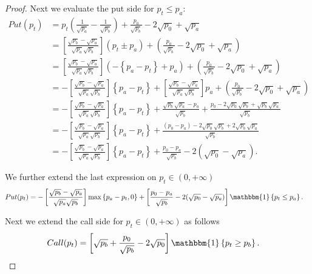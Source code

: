 \documentclass[pdftex,11pt,a4paper] {article}
\begin{document}
\begin{proof}
Next we evaluate the put side for $p_{t}\leq p_{a}$:
\begin{equation} \label{eq:ilf7}
\begin{split}
Put(p_{t}) & = p_{t} \left(\frac{1}{\sqrt{p_{a}}} - \frac{1}{\sqrt{p_{b}}}\right) + \frac{p_{0}}{\sqrt{p_{b}}}  - 2\sqrt{p_{0}} + \sqrt{p_{a}} \\
& = \left[ \frac{\sqrt{p_{b}}-\sqrt{p_{a}}}{\sqrt{p_{a}}\sqrt{p_{b}}}\right] \left(   p_{t} \pm p_{a} \right) + \left(\frac{p_{0}}{\sqrt{p_{b}}}  - 2\sqrt{p_{0}} + \sqrt{p_{a}} \right)\\
& = \left[ \frac{\sqrt{p_{b}}-\sqrt{p_{a}}}{\sqrt{p_{a}}\sqrt{p_{b}}}\right] \left( -\left\{p_{a}-p_{t} \right\} + p_{a}  \right)+  \left(\frac{p_{0}}{\sqrt{p_{b}}}  - 2\sqrt{p_{0}} + \sqrt{p_{a}} \right)  \\
& = -\left[ \frac{\sqrt{p_{b}}-\sqrt{p_{a}}}{\sqrt{p_{a}}\sqrt{p_{b}}}\right] \left\{p_{a}-p_{t}\right\} +  \left[ \frac{\sqrt{p_{b}}-\sqrt{p_{a}}}{\sqrt{p_{a}}\sqrt{p_{b}}}\right]  p_{a} +  \left(\frac{p_{0}}{\sqrt{p_{b}}}  - 2\sqrt{p_{0}} + \sqrt{p_{a}} \right)\\
& = -\left[ \frac{\sqrt{p_{b}}-\sqrt{p_{a}}}{\sqrt{p_{a}}\sqrt{p_{b}}}\right]  \left\{p_{a}-p_{t}\right\} +   \frac{\sqrt{p_{b}}\sqrt{p_{a}}-p_{a}}{\sqrt{p_{b}}} + \frac{p_{0} - 2\sqrt{p_{0}}\sqrt{p_{b}}+ \sqrt{p_{b}}\sqrt{p_{a}}}{\sqrt{p_{b}}}\\
& = -\left[ \frac{\sqrt{p_{b}}-\sqrt{p_{a}}}{\sqrt{p_{a}}\sqrt{p_{b}}}\right] \left\{p_{a}-p_{t} \right\} + \frac{ (p_{0}-p_{a}) - 2\sqrt{p_{0}}\sqrt{p_{b}}+ 2\sqrt{p_{b}}\sqrt{p_{a}}}{\sqrt{p_{b}}}\\
& = -\left[ \frac{\sqrt{p_{b}}-\sqrt{p_{a}}}{\sqrt{p_{a}}\sqrt{p_{b}}}\right]\left\{p_{a}-p_{t}\right\} + \frac{p_{0}-p_{a}}{\sqrt{p_{b}}} - 2(\sqrt{p_{0}}-\sqrt{p_{a}}).
\end{split}
\end{equation}

We further extend the last expression on $p_{t}\in(0, +\infty)$
\begin{equation} \label{eq:ilf8}
\begin{split}
Put(p_{t}) & = -\left[ \frac{\sqrt{p_{b}}-\sqrt{p_{a}}}{\sqrt{p_{a}}\sqrt{p_{b}}}\right] \max \left\{p_{a}-p_{t}, 0 \right\} + \left[\frac{p_{0}-p_{a}}{\sqrt{p_{b}}} - 2(\sqrt{p_{0}}-\sqrt{p_{a}})\right] \mathbbm{1}\left\{p_{t}\leq p_{a}\right\}.
\end{split}
\end{equation}


Next we extend the call side for $p_{t}\in(0, +\infty)$ as follows
\begin{equation} \label{eq:ilf9}
\begin{split}
 Call(p_{t}) &= \left[\sqrt{p_{b}}  + \frac{p_{0}}{\sqrt{p_{b}}}  - 2\sqrt{p_{0}}  \right] \mathbbm{1}\left\{p_{t} \geq p_{b}\right\}.
\end{split}
\end{equation}


\end{proof}
\end{document}
